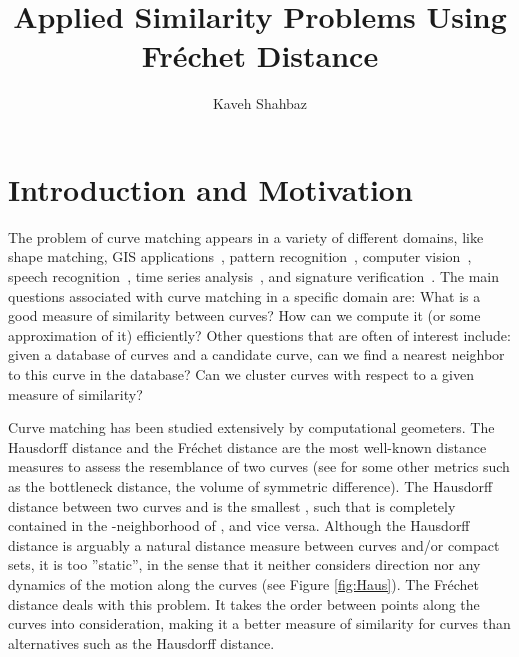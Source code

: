\documentclass[12pt]{dalthesis}
\newcommand{\Frechet}{Fr\'echet }
\begin{document}
\title{
Applied Similarity Problems Using \Frechet Distance 
        \\}
\author{Kaveh Shahbaz}
 

\frontmatter









\pagestyle{fancy}
\fancyhf{}
\renewcommand{\headrulewidth}{0pt}
\fancyhead[LE,RO]{\thepage}
\renewcommand{\chaptermark}[1]{\markboth{\chaptername \ \thechapter.\ #1}{}}
\lhead{\nouppercase{\leftmark}}





\clearpage{}\chapter {Introduction and Motivation}
\setcounter{page}{1}
\label{ch:Background}





The problem of curve matching appears in a variety of different domains, like 
shape matching, GIS applications~\cite{AltERW03a, Buchin10, Appx-MM}, 
pattern recognition~\cite{FDRevisited,JiangXZ08}, 
computer vision~\cite{AltBook2009}, speech recognition~\cite{FDSpeech},  
time series analysis~\cite{FDTime},  
and signature verification~\cite{FDHandwriting,SriraghavendraKB07}.  The main questions
associated with curve matching in a specific domain
are: What is a good measure of similarity between curves? How can we compute it (or some approximation
of it) efficiently? Other questions that are often
of interest include: given a database of curves and a candidate
curve, can we find a nearest neighbor to this curve
in the database? Can we cluster curves with respect to
a given measure of similarity?

Curve matching has been studied extensively by computational 
geometers. 
The Hausdorff distance and the \Frechet distance are the most well-known distance measures 
to assess the resemblance of two curves
(see \cite{SomeOtherMetrics} for some other metrics such as 
the bottleneck distance, the volume of symmetric difference).
The Hausdorff distance between two curves  and  is the smallest ,
such that  is completely contained in the -neighborhood of , and vice
versa. 
Although the Hausdorff distance is arguably a  natural distance
measure between curves and/or compact sets, it is too ”static”,
in the sense that it neither considers 
direction nor any dynamics of the motion along the curves
(see Figure \ref{fig:Haus}). The \Frechet distance deals with
this problem. It takes the order between points along 
the curves into consideration, making it a better 
measure of similarity for curves than alternatives 
such as the Hausdorff distance. 
\end{document}
